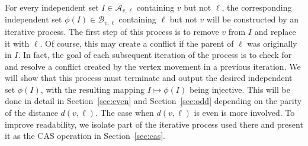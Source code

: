 \documentclass[11pt]{article}
\theoremstyle{definition}
\begin{document}
For every independent set $I\in\mathcal{A}_{v,\ell}$ containing $v$ but not $\ell$, the corresponding independent set $\phi(I)\in\mathcal{B}_{v,\ell}$ containing $\ell$ but not $v$ will be constructed by an iterative process. The first step of this process is to remove $v$ from $I$ and replace it with $\ell$. Of course, this may create a conflict if the parent of $\ell$ was originally in $I$. In fact, the goal of each subsequent iteration of the process is to check for and resolve a conflict created by the vertex movement in a previous iteration. We will show that this process must terminate and output the desired independent set $\phi(I)$, with the resulting mapping $I\mapsto\phi(I)$ being injective. This will be done in detail in Section~\ref{sec:even} and Section~\ref{sec:odd} depending on the parity of the distance $d(v,\ell)$. The case when $d(v,\ell)$ is even is more involved. To improve readability, we isolate part of the iterative process used there and present it as the CAS operation in Section~\ref{sec:cas}.
\end{document}
